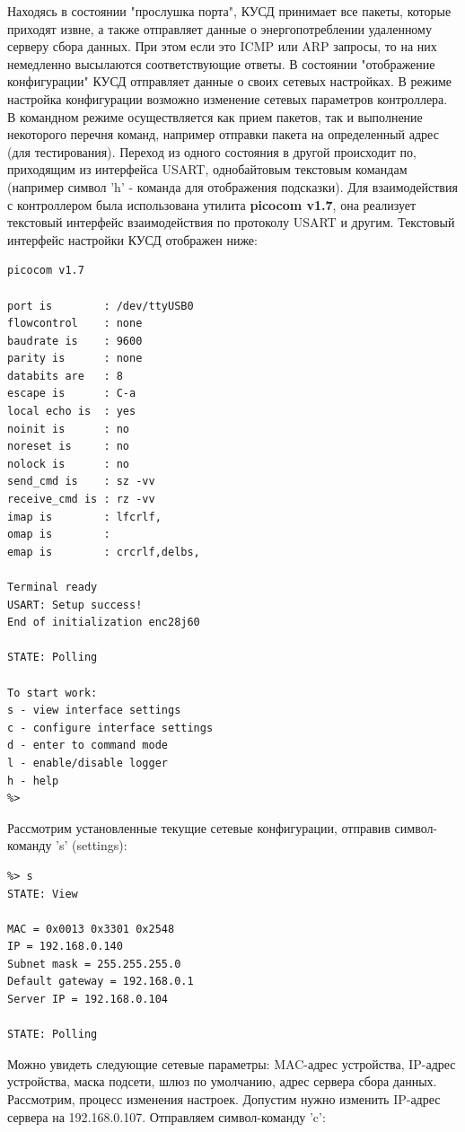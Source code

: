 Находясь в состоянии "прослушка порта", КУСД принимает все пакеты, которые приходят извне, а также отправляет данные о энергопотреблении удаленному серверу сбора данных. При этом если это ICMP или ARP запросы, то на них немедленно высылаются соответствующие ответы. В состоянии "отображение конфигурации" КУСД отправляет данные о своих сетевых настройках. В режиме настройка конфигурации возможно изменение сетевых параметров контроллера. В командном режиме осуществляется как прием пакетов, так и выполнение некоторого перечня команд, например отправки пакета на определенный адрес (для тестирования). Переход из одного состояния в другой происходит по, приходящим из интерфейса USART, однобайтовым текстовым командам (например символ 'h' - команда для отображения подсказки). Для взаимодействия с контроллером была использована утилита \textbf{picocom v1.7}, она реализует текстовый интерфейс взаимодействия по протоколу USART и другим. Текстовый интерфейс настройки КУСД отображен ниже:

\begin{verbatim}
picocom v1.7

port is        : /dev/ttyUSB0
flowcontrol    : none
baudrate is    : 9600
parity is      : none
databits are   : 8
escape is      : C-a
local echo is  : yes
noinit is      : no
noreset is     : no
nolock is      : no
send_cmd is    : sz -vv
receive_cmd is : rz -vv
imap is        : lfcrlf,
omap is        : 
emap is        : crcrlf,delbs,

Terminal ready
USART: Setup success!
End of initialization enc28j60

STATE: Polling

To start work:
s - view interface settings
c - configure interface settings
d - enter to command mode
l - enable/disable logger
h - help
%>
\end{verbatim}

Рассмотрим установленные текущие сетевые конфигурации, отправив символ-команду 's' (settings):
\begin{verbatim}
%> s
STATE: View

MAC = 0x0013 0x3301 0x2548 
IP = 192.168.0.140
Subnet mask = 255.255.255.0
Default gateway = 192.168.0.1
Server IP = 192.168.0.104

STATE: Polling
\end{verbatim}

Можно увидеть следующие сетевые параметры: MAC-адрес устройства, IP-адрес устройства, маска подсети, шлюз по умолчанию, адрес сервера сбора данных. Рассмотрим, процесс изменения настроек. Допустим нужно изменить IP-адрес сервера на 192.168.0.107. Отправляем символ-команду 'c':


